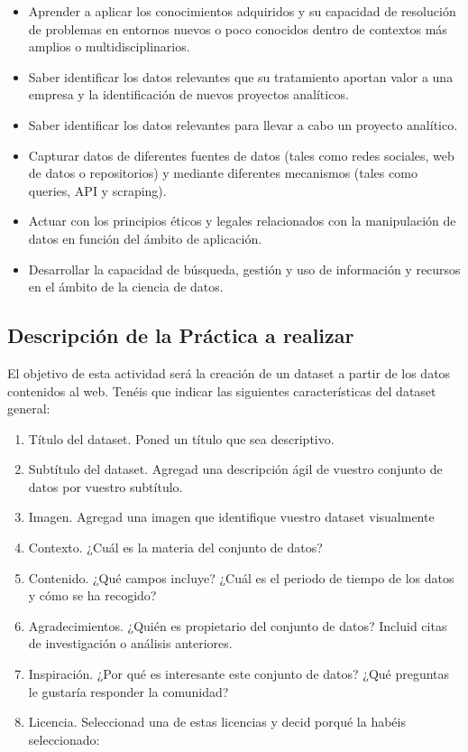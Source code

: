 \documentclass[]{article}
\providecommand{\tightlist}{%
  \setlength{\itemsep}{0pt}\setlength{\parskip}{0pt}}
\begin{document}
\begin{itemize}
\tightlist
\item
  Aprender a aplicar los conocimientos adquiridos y su capacidad de
  resolución de problemas en entornos nuevos o poco conocidos dentro de
  contextos más amplios o multidisciplinarios.
\item
  Saber identificar los datos relevantes que su tratamiento aportan
  valor a una empresa y la identificación de nuevos proyectos
  analíticos.
\item
  Saber identificar los datos relevantes para llevar a cabo un proyecto
  analítico.
\item
  Capturar datos de diferentes fuentes de datos (tales como redes
  sociales, web de datos o repositorios) y mediante diferentes
  mecanismos (tales como queries, API y scraping).
\item
  Actuar con los principios éticos y legales relacionados con la
  manipulación de datos en función del ámbito de aplicación.
\item
  Desarrollar la capacidad de búsqueda, gestión y uso de información y
  recursos en el ámbito de la ciencia de datos.
\end{itemize}

\subsection{Descripción de la Práctica a
realizar}\label{descripcion-de-la-practica-a-realizar}

El objetivo de esta actividad será la creación de un dataset a partir de
los datos contenidos al web. Tenéis que indicar las siguientes
características del dataset general:

\begin{enumerate}
\def\labelenumi{\arabic{enumi}.}
\tightlist
\item
  Título del dataset. Poned un título que sea descriptivo.
\item
  Subtítulo del dataset. Agregad una descripción ágil de vuestro
  conjunto de datos por vuestro subtítulo.
\item
  Imagen. Agregad una imagen que identifique vuestro dataset visualmente
\item
  Contexto. ¿Cuál es la materia del conjunto de datos?
\item
  Contenido. ¿Qué campos incluye? ¿Cuál es el periodo de tiempo de los
  datos y cómo se ha recogido?
\item
  Agradecimientos. ¿Quién es propietario del conjunto de datos? Incluid
  citas de investigación o análisis anteriores.
\item
  Inspiración. ¿Por qué es interesante este conjunto de datos? ¿Qué
  preguntas le gustaría responder la comunidad?
\item
  Licencia. Seleccionad una de estas licencias y decid porqué la habéis
  seleccionado:
\end{enumerate}
\end{document}
